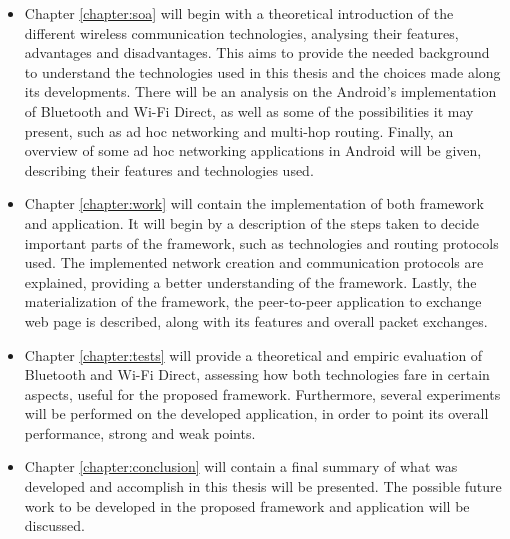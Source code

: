 \begin{itemize}
	
	\item Chapter \ref{chapter:soa} will begin with a theoretical introduction of the different wireless communication technologies, analysing their features, advantages and disadvantages. This aims to provide the needed background to understand the technologies used in this thesis and the choices made along its developments. There will be an analysis on the Android's implementation of Bluetooth and Wi-Fi Direct, as well as some of the possibilities it may present, such as ad hoc networking and multi-hop routing. Finally, an overview of some ad hoc networking applications in Android will be given, describing their features and technologies used.
	
	\item Chapter \ref{chapter:work} will contain the implementation of both framework and application. It will begin by a description of the steps taken to decide important parts of the framework, such as technologies and routing protocols used. The implemented network creation and communication protocols are explained, providing a better understanding of the framework. Lastly, the materialization of the framework, the peer-to-peer application to exchange web page is described, along with its features and overall packet exchanges.
	
	\item Chapter \ref{chapter:tests} will provide a theoretical and empiric evaluation of Bluetooth and Wi-Fi Direct, assessing how both technologies fare in certain aspects, useful for the proposed framework. Furthermore, several experiments will be performed on the developed application, in order to point its overall performance, strong and weak points.
	
	\item Chapter \ref{chapter:conclusion} will contain a final summary of what was developed and accomplish in this thesis will be presented. The possible future work to be developed in the proposed framework and application will be discussed. 
	
\end{itemize}








